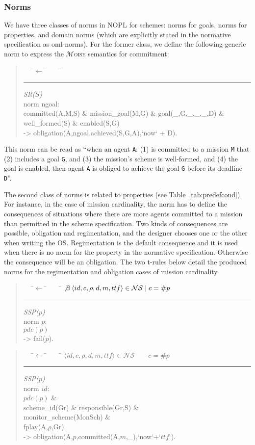 \documentclass{article}
\newcommand{\moise}{{$\mathcal{M}$\textsc{oise}}\xspace}
\newcommand{\st}{\mid}
\newcommand{\set}[1]{\mathcal{#1}}
\newcommand{\andalso}{\quad\quad}
\newcommand{\code}[1]{\texttt{#1}}
\newenvironment{rwrule}[2]
{\begin{quote}\ttfamily\begin{tabbing}~~~\=$\leftarrow$ \= ~~~ \= \kill
     \ensuremath{#2}\\
     \rule[2pt]{6.5cm}{.3pt} \hfill \rwlabel{#1}\\}
{\end{tabbing}\end{quote}}
\newcommand{\rwlabel}[1]{{\scshape\itshape\textrm{#1}}}
\theoremstyle{definition} \newtheorem{definition}{Definition}
\begin{document}
\subsubsection{Norms}


We have three classes of norms in NOPL for schemes: norms for goals,
norms for properties, and domain norms (which are explicitly stated in
the normative specification as oml-norms).  For the former class, we
define the following generic norm to express the \moise semantics for
commitment:

\begin{rwrule}{SR($S$)}
{}
norm ngoal:\\
\>\>    committed(A,M,S) \& mission\_goal(M,G) \& goal(\_,G,\_,\_,\_,D) \&\\
\>\>    well\_formed(S) \& enabled(S,G) \\
-> obligation(A,ngoal,achieved(S,G,A),`now` + D).
\end{rwrule}

This norm can be read as ``when an agent \code{A}: (1) is committed
to a mission \code{M} that (2) includes a goal \code{G}, and (3) the mission's
scheme is well-formed, and (4) the goal is enabled, then agent \code{A} is
obliged to achieve the goal \code{G} before its deadline \code{D}''. 

The second class of norms is related to properties (see
Table~\ref{tab:predefcond}).  For instance, in the case of mission
cardinality, the norm has to define the consequences of situations
where there are more agents committed to a mission than permitted in
the scheme specification. Two kinds of consequences are possible,
obligation and regimentation, and the designer chooses one or the
other when writing the OS.  Regimentation is the default consequence
and it is used when there is no norm for the property in the normative
specification. Otherwise the consequence will be an obligation.  The
two t-rules below detail the produced norms for the regimentation and
obligation cases of mission cardinality.

\begin{rwrule}{SSP($p$)}
  {\not \exists \; \langle id, c, \rho, d, m, ttf \rangle \in \set{NS} \st  c = \#p}
  norm $p$: \\
  \> \>         $pdc(p)$\\
  \>   -> \> fail($p$). 
\end{rwrule}

\begin{rwrule}{SSP($p$)}
  {\langle id, c, \rho, d, m, ttf \rangle \in \set{NS} \andalso c = \#p}
  norm $id$: \\
  \> \> $pdc(p)$ \& \\
  \> \> scheme\_id(Gr) \& responsible(Gr,S) \& \\
  \> \> monitor\_scheme(MonSch) \& \\
  \> \> fplay(A,$\rho$,Gr) \\
-> \> obligation(A,$p$,committed(A,$m$,\_),`now`+`$ttf$`).
\end{rwrule}
\end{document}
